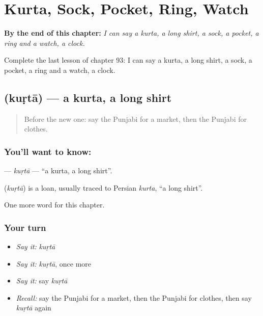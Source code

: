 
\chapter{Kurta, Sock, Pocket, Ring, Watch}
\label{ch:pa-kurta-sock-pocket-ring-watch}

\begin{chapteropening}
\textbf{By the end of this chapter:} \emph{I can say a kurta, a long shirt, a sock, a pocket, a ring and a watch, a clock.}

Complete the last lesson of chapter 93: I can say a kurta, a long shirt, a sock, a pocket, a ring and a watch, a clock.
\end{chapteropening}

\section[\texorpdfstring{\pa{ਕੁੜਤਾ} (kuṛtā)}{ਕੁੜਤਾ (kuṛtā)}]{ (kuṛtā) — a kurta, a long shirt}

\label{lesson:PA-C93-kurta}



\begin{quote}
Before the new one: say the Punjabi for a market, then the Punjabi for clothes.
\end{quote}

\subsection*{You'll want to know: }
\textbf{} — \emph{kuṛtā} — \textquotedblleft{}a kurta, a long shirt\textquotedblright{}.

\begin{cousinweb}
\textbf{} (\emph{kuṛtā}) is a loan, usually traced to Persian \emph{kurta}, \textquotedblleft{}a long shirt\textquotedblright{}.
\end{cousinweb}

\begin{grammarlens}[title={What you've built}]
One more word for this chapter.
\end{grammarlens}

\subsection*{Your turn}
\begin{itemize}
\raggedright
  \item \emph{Say it:} \emph{kuṛtā}
  \item \emph{Say it:} \emph{kuṛtā}, once more
  \item \emph{Say it:} say \emph{kuṛtā}
  \item \emph{Recall:} say the Punjabi for a market, then the Punjabi for clothes, then say \emph{kuṛtā} again
\end{itemize}

